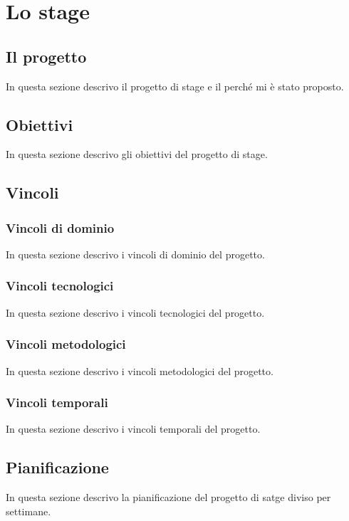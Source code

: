 
\chapter{Lo stage}
\label{cap:stage}
\section{Il progetto}
In questa sezione descrivo il progetto di stage e il perché mi è stato proposto. 

\section{Obiettivi}
In questa sezione descrivo gli obiettivi del progetto di stage.

\section{Vincoli}

\subsection{Vincoli di dominio}
In questa sezione descrivo i vincoli di dominio del progetto.

\subsection{Vincoli tecnologici}
In questa sezione descrivo i vincoli tecnologici del progetto.

\subsection{Vincoli metodologici}
In questa sezione descrivo i vincoli metodologici del progetto.

\subsection{Vincoli temporali}
In questa sezione descrivo i vincoli temporali del progetto.

\section{Pianificazione}
In questa sezione descrivo la pianificazione del progetto di satge diviso per settimane.